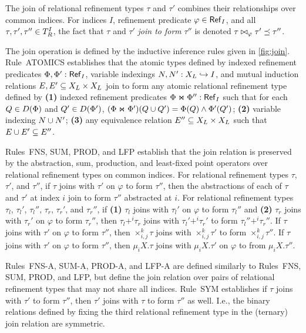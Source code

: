 The join of relational refinement types $\tau$ and $\tau'$ combines
their relationships over common indices.
%
For indices $I$, refinement predicate $\varphi \in \mathsf{Ref}_{I}$, and
all $\tau, \tau', \tau'' \in T_{R}^{I}$, the fact that $\tau$ and
$\tau'$ \emph{join to form} $\tau''$ is denoted
$\tau \bowtie_{ \varphi } \tau' \preceq \tau''$.

The join operation is defined by the inductive inference rules given
in \autoref{fig:join}.
Rule~ATOMICS establishes that the atomic types defined by %
indexed refinement predicates $\Phi, \Phi' : \mathsf{Ref}_{I}$, %
variable indexings $N, N' : X_L \hookrightarrow I$, and %
mutual induction relations $E, E' \subseteq X_L \times X_L$
join to form any atomic relational refinement type defined by %
\textbf{(1)} indexed refinement predicates
$\Phi \Join \Phi'' : \mathsf{Ref}_{I}$ such that for each
$Q \in D(\Phi)$ and $Q' \in D(\Phi')$,
$(\Phi \Join \Phi')(Q \cup Q') = \Phi(Q) \land \Phi'(Q')$; %
\textbf{(2)} variable indexing $N \cup N'$; %
\textbf{(3)} any equivalence relation
$E'' \subseteq X_L \times X_L$ such that
$E \cup E' \subseteq E''$.

Rules~FNS, SUM, PROD, and LFP establish that the join relation is
preserved by the abstraction, sum, production, and least-fixed point
operators over relational refinement types on common indices.
%
For relational refinement types $\tau$, $\tau'$, and $\tau''$, if
$\tau$ joins with $\tau'$ on $\varphi$ to form $\tau''$, then the
abstractions of each of $\tau$ and $\tau'$ at index $i$ join to form
$\tau''$ abstracted at $i$.
For relational refinement types $\tau_l$, $\tau_l'$, $\tau_l''$,
$\tau_r$, $\tau_r'$, and $\tau_r''$, if %
\textbf{(1)} $\tau_l$ joins with $\tau_l'$ on $\varphi$ to form
$\tau_l''$ and %
\textbf{(2)} $\tau_r$ joins with $\tau_r'$ on $\varphi$ to form
$\tau_r''$, then $\tau_l +^i \tau_r$ joins with $\tau_l' +^i \tau_r'$
to form $\tau_l'' +^i \tau_r''$.
If $\tau$ joins with $\tau'$ on $\varphi$ to form $\tau''$, then %
$\times_{i, j}^k \tau$ joins with $\times_{i, j}^k \tau'$ to form
$\times_{i, j}^k \tau''$.
If $\tau$ joins with $\tau'$ on $\varphi$ to form $\tau''$, then %
$\mu_i X. \tau$ joins with $\mu_i X. \tau'$ on $\varphi$ to from
$\mu_i X. \tau''$.

Rules~FNS-A, SUM-A, PROD-A, and LFP-A are defined similarly to
Rules~FNS, SUM, PROD, and LFP, but define the join relation over pairs
of relational refinement types that may not share all indices.
%
Rule~SYM establishes if $\tau$ joins with $\tau'$ to form $\tau''$,
then $\tau'$ joins with $\tau$ to form $\tau''$ as well.
%
I.e., the binary relations defined by fixing the third relational
refinement type in the (ternary) join relation are symmetric.

